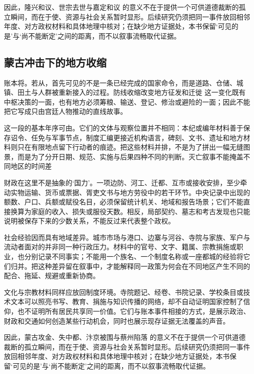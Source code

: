 因此，隆兴和议、世宗去世与嘉定和议 的意义不在于提供一个可供道德裁断的孤立瞬间，而在于使、资源与社会关系暂时显形。后续研究仍须把同一事件放回相邻年度、对方政权材料和具体地理中核对；在缺少地方证据处，本书保留‘可见的是’与‘尚不能断定’之间的距离，而不以叙事流畅取代证据。

\subsection{蒙古冲击下的地方收缩}

账本将。若从，首先可见的不是一条已经完成的国家命令，而是道路、仓储、城镇、田土与人群被重新接入的过程。防线收缩改变地方征发和迁徙 这一变化既有中枢决策的一面，也有地方必须筹粮、输送、登记、修治或避险的一面；因此不能把它写成只由宫廷人物推动的直线故事。

这一段的基本年序可由。它们的文体与观察位置并不相同：本纪或编年材料善于保存诏令、任免与军事节点，制度汇编更接近机构语言，碑刻、文书、遗址和地方材料则只在有限地点留下行动者的痕迹。把这些材料并排，不是为了拼出一幅无缝图景，而是为了分开日期、规范、实施与后果四种不同的判断。灭亡叙事不能掩盖不同地区的时间差

财政在这里不是抽象的‘国力’。一项边防、河工、迁都、互市或接收安排，至少牵动实物运输、货币或票据、胥吏文书与地方劳役中的若干环节。中央记录中出现的额数、户口、兵额或赋役名目，必须保留统计机关、地域和报告场景；它们不能直接换算为家庭的收入、损失或服役天数。相反，局部契约、墓志和考古发现也只能说明被保存下来的少数关系，不能反过来代表整个政权。

社会经验因而具有地域差异。城市市场与港口、边寨与河谷、寺院与家族、军户与流动者面对的并非同一种行政压力。材料中的官号、文字、籍属、宗教捐施或职业，也分别记录不同事实；不能用一个族名、一个制度名称或一座都城的经验将它们归并。把这种差异留在叙事中，才能解释同一政策为何会在不同地区产生不同的配合、拖延、规避或重新协商。

文化与宗教材料同样应放回制度环境。寺院题记、经卷、书院记录、学校条目或技术文本可以照亮书写、教育、捐施与知识传播的网络，却不自动证明国家控制了信仰，也不证明所有居民共享同一价值。它们与账本事件相接的方式，是展示政治、财政和交通如何创造某些行动机会，同时也展示现存证据无法覆盖的声音。

因此，蒙古攻金、失中都、汴京被围与蔡州陷落 的意义不在于提供一个可供道德裁断的孤立瞬间，而在于使、资源与社会关系暂时显形。后续研究仍须把同一事件放回相邻年度、对方政权材料和具体地理中核对；在缺少地方证据处，本书保留‘可见的是’与‘尚不能断定’之间的距离，而不以叙事流畅取代证据。

